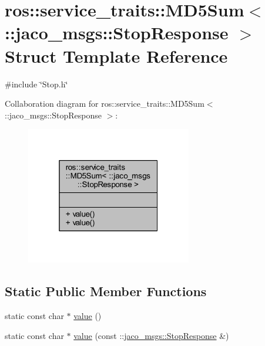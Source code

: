 \hypertarget{structros_1_1service__traits_1_1MD5Sum_3_01_1_1jaco__msgs_1_1StopResponse_01_4}{}\section{ros\+:\+:service\+\_\+traits\+:\+:M\+D5\+Sum$<$ \+:\+:jaco\+\_\+msgs\+:\+:Stop\+Response $>$ Struct Template Reference}
\label{structros_1_1service__traits_1_1MD5Sum_3_01_1_1jaco__msgs_1_1StopResponse_01_4}


{\ttfamily \#include \char`\"{}Stop.\+h\char`\"{}}



Collaboration diagram for ros\+:\+:service\+\_\+traits\+:\+:M\+D5\+Sum$<$ \+:\+:jaco\+\_\+msgs\+:\+:Stop\+Response $>$\+:
\nopagebreak
\begin{figure}[H]
\begin{center}
\leavevmode
\includegraphics[width=205pt]{d9/d76/structros_1_1service__traits_1_1MD5Sum_3_01_1_1jaco__msgs_1_1StopResponse_01_4__coll__graph}
\end{center}
\end{figure}
\subsection*{Static Public Member Functions}
\begin{DoxyCompactItemize}
\item 
static const char $\ast$ \hyperlink{structros_1_1service__traits_1_1MD5Sum_3_01_1_1jaco__msgs_1_1StopResponse_01_4_af18dae0baa11f40f3e29e137e18e9191}{value} ()
\item 
static const char $\ast$ \hyperlink{structros_1_1service__traits_1_1MD5Sum_3_01_1_1jaco__msgs_1_1StopResponse_01_4_a1bb8f10f3765925ca0bf944389917a81}{value} (const \+::\hyperlink{namespacejaco__msgs_a2694506badd782d8dc5474717333e374}{jaco\+\_\+msgs\+::\+Stop\+Response} \&)
\end{DoxyCompactItemize}


